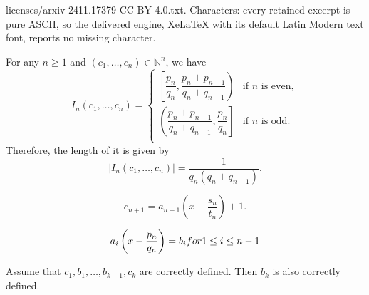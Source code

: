 \documentclass[10pt,a4paper]{amsart}
\renewcommand{\text}{\textup}
\begin{document}
licenses/arxiv-2411.17379-CC-BY-4.0.txt. Characters: every retained excerpt is pure ASCII, so the delivered engine, XeLaTeX with its default Latin Modern text font, reports no missing character.
\begin{proposition}\label{range}
For any $n\ge 1$ and $\left(c_{1},\ldots,c_{n}\right)\in\mathbb{N}^{n}$, we have
\begin{equation}I_{n}\left(c_{1},\ldots,c_{n}\right)=\left\{
  \begin{array}{ll}
   \left[\dfrac{p_{n}}{q_{n}},\dfrac{p_{n}+p_{n-1}}{q_{n}+q_{n-1}}\right) &\textrm{if }n\textrm{ is even},\\
   \left(\dfrac{p_{n}+p_{n-1}}{q_{n}+q_{n-1}},\dfrac{p_{n}}{q_{n}}\right] &\textrm{if }n\textrm{ is odd}.\\
  \end{array}
\right.
\end{equation}
Therefore, the length of it is given by
\begin{equation}\label{length}
\left|I_{n}\left(c_{1},\ldots,c_{n}\right)\right|=\dfrac{1}{q_{n}\left(q_{n}+q_{n-1}\right)}.
\end{equation}
\end{proposition}

\begin{equation}\label{algorithm:cn}
c_{n+1} = a_{n+1} \left(    x - \frac{s_n}{t_n}  \right)  +1.
\end{equation}

\begin{equation}\label{condition:cylinder:x-pq}
a_i \left( x - \frac{p_n}{q_n} \right) = b_i  \text{ for } 1\leq i \leq n-1
\end{equation}

\begin{lemma}\label{bk_correctly_defined}
    Assume that $c_1,b_1,\ldots,b_{k-1},c_k$ are correctly defined. Then $b_k$ is also correctly defined.
\end{lemma}
\end{document}
